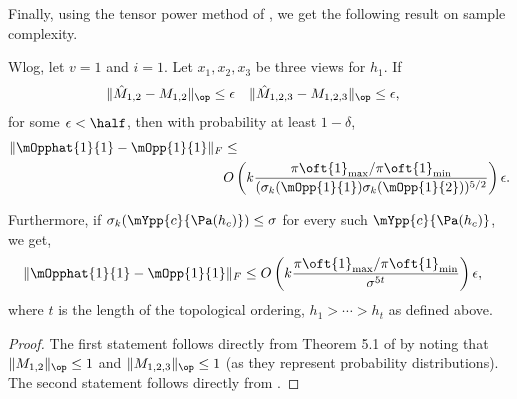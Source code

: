 Finally, using the tensor power method of \citep{anandkumar13tensor}, we
  get the following result on sample complexity.
\begin{theorem}
  \label{thm:sample-complexity-1}
  Wlog, let $v=1$ and $i=1$. Let $x_1, x_2, x_3$ be three views for
  $h_1$.  
  If 
\begin{align*}
  \|\hat M_{1,2} - M_{1,2}\|_{\op} &\le \epsilon & \|\hat M_{1,2,3} - M_{1,2,3}\|_{\op} &\le \epsilon,
\end{align*}
for some $\epsilon < \half$, then
with probability at least $1 - \delta$,
\begin{align*}
  \|\mOpphat{1}{1} - \mOpp{1}{1}\|_F 
    &\le  \\
    &
      O\left( k 
      \frac{{\pi\oft{1}}_{\max}/{\pi\oft{1}}_{\min}} 
      {(\sigma_{k}(\mOpp{1}{1}) \sigma_{k}(\mOpp{1}{2}))^{5/2}} \right) \epsilon.
\end{align*}

Furthermore, if $\sigma_{k}(\mYpp{c}{\Pa(h_c)}) \le \sigma$ for every
  such
$\mYpp{c}{\Pa(h_c)}$, we get,
\begin{align*}
  \|\mOpphat{1}{1} - \mOpp{1}{1}\|_F 
    &\le 
      O\left( k 
      \frac{{\pi\oft{1}}_{\max}/{\pi\oft{1}}_{\min}} 
      {\sigma^{5t}} \right) \epsilon,
\end{align*}
where $t$ is the length of the topological ordering, $h_1 > \cdots
> h_t$ as defined above.
\end{theorem}
\begin{proof}
  The first statement follows directly from Theorem 5.1 of
  \citet{anandkumar13tensor} by noting that $\|M_{1,2}\|_\op \le 1$ and
  $\|M_{1,2,3}\|_\op \le 1$ (as they represent probability
  distributions). The second statement follows directly from
  .
\end{proof}

